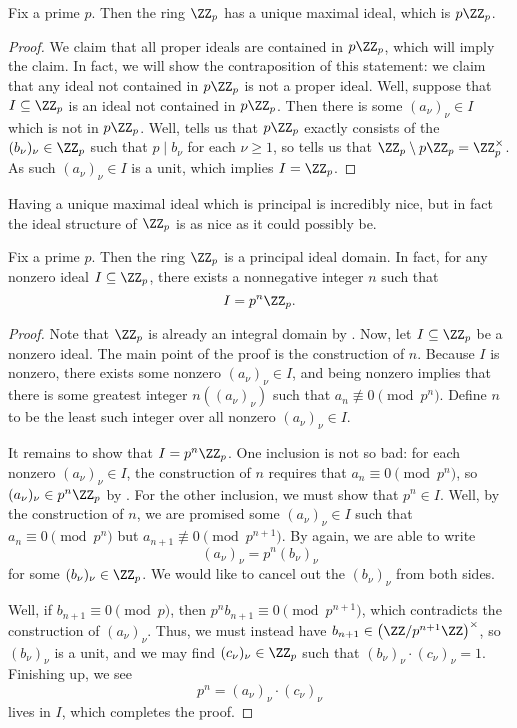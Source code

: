 \documentclass[../notes.tex]{subfiles}
\begin{document}
\begin{corollary}
	Fix a prime $p$. Then the ring $\ZZ_p$ has a unique maximal ideal, which is $p\ZZ_p$.
\end{corollary}
\begin{proof}
	We claim that all proper ideals are contained in $p\ZZ_p$, which will imply the claim. In fact, we will show the contraposition of this statement: we claim that any ideal not contained in $p\ZZ_p$ is not a proper ideal. Well, suppose that $I\subseteq\ZZ_p$ is an ideal not contained in $p\ZZ_p$. Then there is some $(a_\nu)_\nu\in I$ which is not in $p\ZZ_p$. Well,  tells us that $p\ZZ_p$ exactly consists of the $(b_\nu)_\nu\in\ZZ_p$ such that $p\mid b_\nu$ for each $\nu\ge1$, so  tells us that $\ZZ_p\setminus p\ZZ_p=\ZZ_p^\times$. As such $(a_\nu)_\nu\in I$ is a unit, which implies $I=\ZZ_p$.
\end{proof}
Having a unique maximal ideal which is principal is incredibly nice, but in fact the ideal structure of $\ZZ_p$ is as nice as it could possibly be.
\begin{proposition}
	Fix a prime $p$. Then the ring $\ZZ_p$ is a principal ideal domain. In fact, for any nonzero ideal $I\subseteq\ZZ_p$, there exists a nonnegative integer $n$ such that
	\[I=p^n\ZZ_p.\]
\end{proposition}
\begin{proof}
	Note that $\ZZ_p$ is already an integral domain by . Now, let $I\subseteq\ZZ_p$ be a nonzero ideal. The main point of the proof is the construction of $n$. Because $I$ is nonzero, there exists some nonzero $(a_\nu)_\nu\in I$, and being nonzero implies that there is some greatest integer $n((a_\nu)_\nu)$ such that $a_n\not\equiv0\pmod{p^n}$. Define $n$ to be the least such integer over all nonzero $(a_\nu)_\nu\in I$.

	It remains to show that $I=p^n\ZZ_p$. One inclusion is not so bad: for each nonzero $(a_\nu)_\nu\in I$, the construction of $n$ requires that $a_n\equiv0\pmod{p^n}$, so $(a_\nu)_\nu\in p^n\ZZ_p$ by . For the other inclusion, we must show that $p^n\in I$. Well, by the construction of $n$, we are promised some $(a_\nu)_\nu\in I$ such that $a_n\equiv0\pmod{p^n}$ but $a_{n+1}\not\equiv0\pmod{p^{n+1}}$. By  again, we are able to write
	\[(a_\nu)_\nu=p^n(b_\nu)_\nu\]
	for some $(b_\nu)_\nu\in\ZZ_p$. We would like to cancel out the $(b_\nu)_\nu$ from both sides.
	
	Well, if $b_{n+1}\equiv0\pmod p$, then $p^nb_{n+1}\equiv0\pmod{p^{n+1}}$, which contradicts the construction of $(a_\nu)_\nu$. Thus, we must instead have $b_{n+1}\in\left(\ZZ/p^{n+1}\ZZ\right)^\times$, so $(b_\nu)_\nu$ is a unit, and we may find $(c_\nu)_\nu\in\ZZ_p$ such that $(b_\nu)_\nu\cdot(c_\nu)_\nu=1$. Finishing up, we see
	\[p^n=(a_\nu)_\nu\cdot(c_\nu)_\nu\]
	lives in $I$, which completes the proof.
\end{proof}
\end{document}
